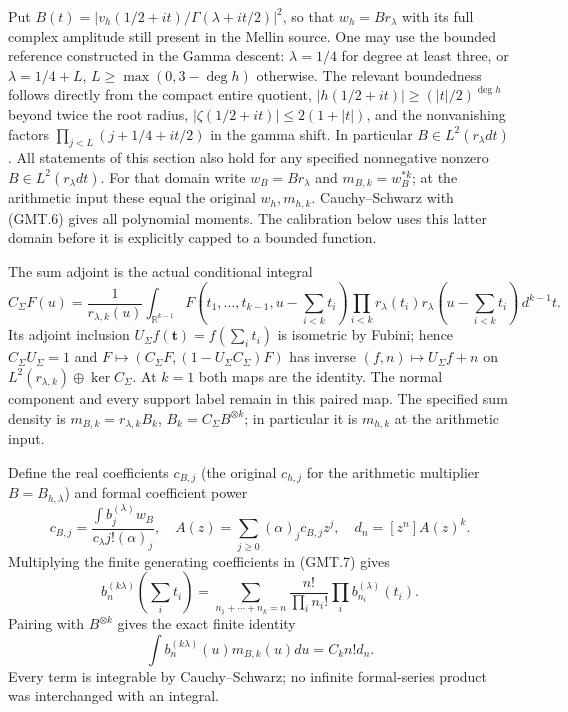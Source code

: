 \documentclass[11pt]{article}
\newcommand{\R}{\mathbb R}
\begin{document}
Put $B(t)=|v_h(1/2+it)/\Gamma(\lambda+it/2)|^2$, so that
$w_h=B r_\lambda$ with its full complex amplitude still present
in the Mellin source. One may use the bounded reference constructed
in the Gamma descent: $\lambda=1/4$ for degree at least three,
or $\lambda=1/4+L$, $L\ge\max(0,3-\deg h)$ otherwise.
The relevant boundedness follows directly from the compact entire
quotient, $|h(1/2+it)|\ge(|t|/2)^{\deg h}$ beyond twice the root
radius, $|\zeta(1/2+it)|\le2(1+|t|)$, and the nonvanishing factors
$\prod_{j<L}(j+1/4+it/2)$ in the gamma shift. In particular
$B\in L^2(r_\lambda dt)$. All statements of this section also hold
for any specified nonnegative nonzero $B\in L^2(r_\lambda dt)$.
For that domain write $w_B=B r_\lambda$ and $m_{B,k}=w_B^{*k}$;
at the arithmetic input these equal the original $w_h,m_{h,k}$.
Cauchy--Schwarz with (GMT.6) gives all polynomial moments.
The calibration below uses this latter domain before it is explicitly
capped to a bounded function.

The sum adjoint is the actual conditional integral
\[
 C_\Sigma F(u)=\frac{1}{r_{\lambda,k}(u)}
 \int_{\R^{k-1}}F(t_1,\ldots,t_{k-1},u-\textstyle\sum_{i<k}t_i)
 \prod_{i<k}r_\lambda(t_i)r_\lambda(u-\textstyle\sum_{i<k}t_i)
 \,d^{k-1}t.                                                    \tag{GMT.9}
\]
Its adjoint inclusion $U_\Sigma f(\mathbf t)=f(\sum_i t_i)$
is isometric by Fubini; hence $C_\Sigma U_\Sigma=1$ and
$F\mapsto(C_\Sigma F,(1-U_\Sigma C_\Sigma)F)$ has inverse
$(f,n)\mapsto U_\Sigma f+n$ on
$L^2(r_{\lambda,k})\oplus\ker C_\Sigma$. At $k=1$ both maps
are the identity. The normal component and every support label
remain in this paired map. The specified sum density is
$m_{B,k}=r_{\lambda,k}B_k$, $B_k=C_\Sigma B^{\otimes k}$;
in particular it is $m_{h,k}$ at the arithmetic input.

Define the real coefficients $c_{B,j}$ (the original $c_{h,j}$
for the arithmetic multiplier $B=B_{h,\lambda}$) and formal coefficient power
\[
 c_{B,j}=\frac{\int b_j^{(\lambda)}w_B}{c_\lambda j!(\alpha)_j},
 \quad A(z)=\sum_{j\ge0}(\alpha)_j c_{B,j}z^j,
 \quad d_n=[z^n]A(z)^k.                                        \tag{GMT.10}
\]
Multiplying the finite generating coefficients in (GMT.7) gives
\[
 b_n^{(k\lambda)}(\textstyle\sum_i t_i)=
 \sum_{n_1+\cdots+n_k=n}\frac{n!}{\prod_i n_i!}
                   \prod_i b_{n_i}^{(\lambda)}(t_i).
\]
Pairing with $B^{\otimes k}$ gives the exact finite identity
\[
 \int b_n^{(k\lambda)}(u)m_{B,k}(u)du=C_k n!d_n.                \tag{GMT.11}
\]
Every term is integrable by Cauchy--Schwarz; no infinite formal-series
product was interchanged with an integral.
\end{document}
